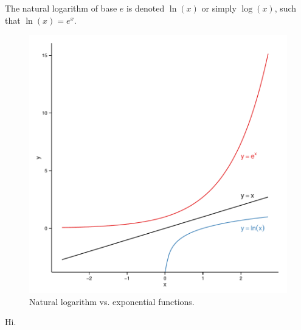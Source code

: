 The natural logarithm of base $e$ is denoted $\ln(x)$ or simply $\log(x)$, such that $\ln(x)=e^x$.

\begin{knitrout}
\color{fgcolor}\begin{figure}[]

\includegraphics[width=\linewidth]{images/math-fun_expln} \caption{Natural logarithm vs. exponential functions.\label{fig:fun_expln}}
\end{figure}


\end{knitrout}


Hi.


